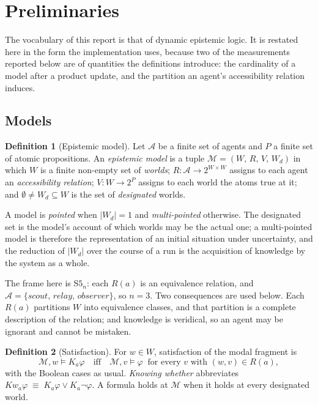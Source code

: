 \documentclass[11pt,a4paper]{article}
\theoremstyle{definition}
\newtheorem{definition}{Definition}
\newcommand{\Ag}{\mathcal{A}}
\newcommand{\Mod}{\mathcal{M}}
\newcommand{\Kop}[1]{K_{#1}}
\newcommand{\Kw}[1]{\mathit{Kw}_{#1}}
\begin{document}
\section{Preliminaries}
\label{sec:prelim}

The vocabulary of this report is that of dynamic epistemic logic. It is
restated here in the form the implementation uses, because two of the
measurements reported below are of quantities the definitions introduce: the
cardinality of a model after a product update, and the partition an agent's
accessibility relation induces.

\subsection{Models}

\begin{definition}[Epistemic model]
\label{def:model}
Let $\Ag$ be a finite set of agents and $P$ a finite set of atomic
propositions. An \emph{epistemic model} is a tuple
$\Mod = (W,\, R,\, V,\, W_d)$ in which $W$ is a finite non-empty set of
\emph{worlds}; $R : \Ag \to 2^{W \times W}$ assigns to each agent an
\emph{accessibility relation}; $V : W \to 2^{P}$ assigns to each world the
atoms true at it; and $\emptyset \neq W_d \subseteq W$ is the set of
\emph{designated} worlds.
\end{definition}

A model is \emph{pointed} when $|W_d| = 1$ and \emph{multi-pointed} otherwise.
The designated set is the model's account of which worlds may be the actual
one; a multi-pointed model is therefore the representation of an initial
situation under uncertainty, and the reduction of $|W_d|$ over the course of a
run is the acquisition of knowledge by the system as a whole.

The frame here is $\mathrm{S5}_n$: each $R(a)$ is an equivalence relation, and
$\Ag = \{\mathit{scout},\, \mathit{relay},\, \mathit{observer}\}$, so $n = 3$.
Two consequences are used below. Each $R(a)$ partitions $W$ into equivalence
classes, and that partition is a complete description of the relation; and
knowledge is veridical, so an agent may be ignorant and cannot be mistaken.

\begin{definition}[Satisfaction]
\label{def:sat}
For $w \in W$, satisfaction of the modal fragment is
\[
  \Mod, w \models \Kop{a}\varphi
  \quad\text{iff}\quad
  \Mod, v \models \varphi \ \text{ for every } v \text{ with } (w,v) \in R(a),
\]
with the Boolean cases as usual. \emph{Knowing whether} abbreviates
$\Kw{a}\varphi \;\equiv\; \Kop{a}\varphi \vee \Kop{a}\neg\varphi$. A formula
holds at $\Mod$ when it holds at every designated world.
\end{definition}
\end{document}

